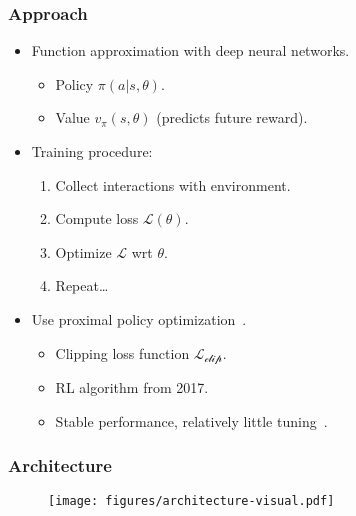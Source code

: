 \begin{frame}
    \frametitle{Approach}

    \begin{itemize}
        \item Function approximation with deep neural networks.
        \begin{itemize}
            \item Policy \(\pi(a | s, \theta)\).
            \item Value \(v_\pi(s, \theta)\) (predicts future reward).
        \end{itemize}
        \item Training procedure:
        \begin{enumerate}
            \item Collect interactions with environment.
            \item Compute loss \(\mathcal{L(\theta)}\).
            \item Optimize \(\mathcal{L}\) wrt \(\theta\).
            \item Repeat\dots
        \end{enumerate}
        \item Use proximal policy optimization~\cite{schulman_proximal_2017}.
        \begin{itemize}
            \item Clipping loss function \(\mathcal{L_\text{clip}}\).
            \item RL algorithm from 2017.
            \item Stable performance, relatively little tuning~\cite{henderson_deep_2018}.
        \end{itemize}

    \end{itemize}
\end{frame}

\begin{frame}
    \frametitle{Architecture}

    \begin{figure}
        \centering
        \texttt{[image: figures/architecture-visual.pdf]}
    \end{figure}

\end{frame}

